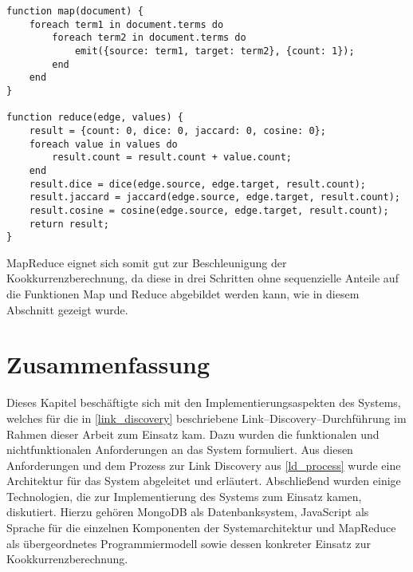 \begin{lstlisting}[language=pseudo, label={lst:mapred_edges2}, caption={Kantenerzeugung mit MapReduce}, float=ht]
function map(document) {
    foreach term1 in document.terms do
        foreach term2 in document.terms do
            emit({source: term1, target: term2}, {count: 1});
        end
    end
}

function reduce(edge, values) {
    result = {count: 0, dice: 0, jaccard: 0, cosine: 0};
    foreach value in values do
        result.count = result.count + value.count;
    end
    result.dice = dice(edge.source, edge.target, result.count);
    result.jaccard = jaccard(edge.source, edge.target, result.count);
    result.cosine = cosine(edge.source, edge.target, result.count);
    return result;
}
\end{lstlisting}

MapReduce eignet sich somit gut zur Beschleunigung der Kookkurrenzberechnung, da diese in drei Schritten ohne sequenzielle Anteile auf die Funktionen Map und Reduce abgebildet werden kann, wie in diesem Abschnitt gezeigt wurde.

\section{Zusammenfassung}

Dieses Kapitel beschäftigte sich mit den Implementierungsaspekten des Systems, welches für die in \cref{link_discovery} beschriebene Link--Discovery--Durchführung im Rahmen dieser Arbeit zum Einsatz kam. Dazu wurden die funktionalen und nichtfunktionalen Anforderungen an das System formuliert. Aus diesen Anforderungen und dem Prozess zur Link Discovery aus \cref{ld_process} wurde eine Architektur für das System abgeleitet und erläutert. Abschließend wurden einige Technologien, die zur Implementierung des Systems zum Einsatz kamen, diskutiert. Hierzu gehören MongoDB als Datenbanksystem, JavaScript als Sprache für die einzelnen Komponenten der Systemarchitektur und MapReduce als übergeordnetes Programmiermodell sowie dessen konkreter Einsatz zur Kookkurrenzberechnung.